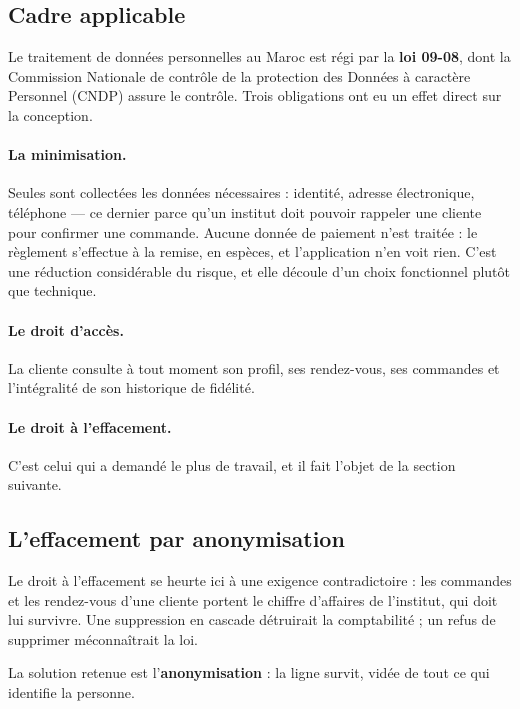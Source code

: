 \subsection{Cadre applicable}

Le traitement de données personnelles au Maroc est régi par la \textbf{loi
09-08}, dont la Commission Nationale de contrôle de la protection des Données à
caractère Personnel (CNDP) assure le contrôle. Trois obligations ont eu un
effet direct sur la conception.

\paragraph{La minimisation.} Seules sont collectées les données nécessaires :
identité, adresse électronique, téléphone --- ce dernier parce qu'un institut
doit pouvoir rappeler une cliente pour confirmer une commande. Aucune donnée de
paiement n'est traitée : le règlement s'effectue à la remise, en espèces, et
l'application n'en voit rien. C'est une réduction considérable du risque, et
elle découle d'un choix fonctionnel plutôt que technique.

\paragraph{Le droit d'accès.} La cliente consulte à tout moment son profil, ses
rendez-vous, ses commandes et l'intégralité de son historique de fidélité.

\paragraph{Le droit à l'effacement.} C'est celui qui a demandé le plus de
travail, et il fait l'objet de la section suivante.

\subsection{L'effacement par anonymisation}

Le droit à l'effacement se heurte ici à une exigence contradictoire : les
commandes et les rendez-vous d'une cliente portent le chiffre d'affaires de
l'institut, qui doit lui survivre. Une suppression en cascade détruirait la
comptabilité ; un refus de supprimer méconnaîtrait la loi.

La solution retenue est l'\textbf{anonymisation} : la ligne survit, vidée de
tout ce qui identifie la personne.

